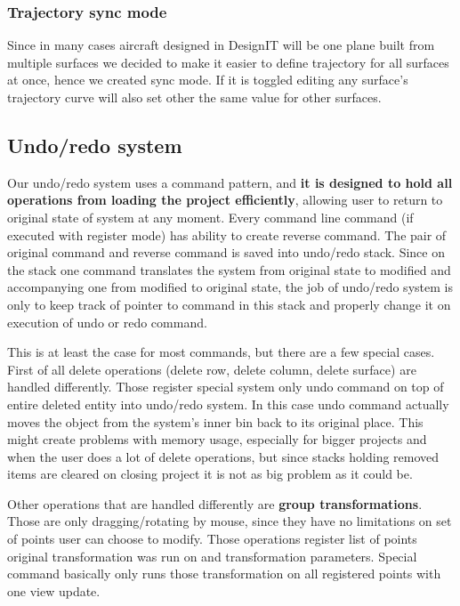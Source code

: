 \documentclass[a4paper, 11pt, article]{report}
\begin{document}
\subsubsection{Trajectory sync mode}

Since in many cases aircraft designed in DesignIT will be one plane built from multiple surfaces we decided to make it easier to define trajectory for all surfaces at once, hence we created sync mode. If it is toggled editing any surface's trajectory curve will also set other the same value for other surfaces.

\subsection{Undo/redo system}

Our undo/redo system uses a command pattern, and \textbf{it is designed to hold all operations from loading the project efficiently}, allowing user to return to original state of system at any moment. Every command line command (if executed with register mode) has ability to create reverse command. The pair of original command and reverse command is saved into undo/redo stack. Since on the stack one command translates the system from original state to modified and accompanying one from modified to original state, the job of undo/redo system is only to keep track of pointer to command in this stack and properly change it on execution of undo or redo command. 

This is at least the case for most commands, but there are a few special cases. First of all delete operations (delete row, delete column, delete surface) are handled differently. Those register special system only undo command on top of entire deleted entity into undo/redo system. In this case undo command actually moves the object from the system's inner bin back to its original place. This might create problems with memory usage, especially for bigger projects and when the user does a lot of delete operations, but since stacks holding removed items are cleared on closing project it is not as big problem as it could be. 

Other operations that are handled differently are \textbf{group transformations}. Those are only dragging/rotating by mouse, since they have no limitations on set of points user can choose to modify. Those operations register list of points original transformation was run on and transformation parameters. Special command basically only runs those transformation on all registered points with one view update.
\end{document}
